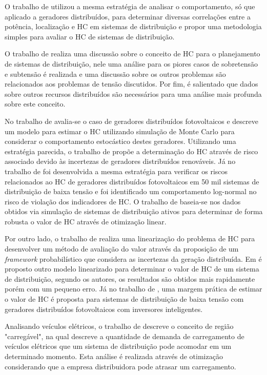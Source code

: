O trabalho de  utilizou a mesma estratégia de analisar o comportamento, só que aplicado a geradores distribuídos, para determinar diversas correlações entre a potência, localização e \ac{HC} em sistemas de distribuição e propor uma metodologia simples para avaliar o \ac{HC} de sistemas de distribuição.

O trabalho de  realiza uma discussão sobre o conceito de \ac{HC} para o planejamento de sistemas de distribuição, nele uma análise para os piores casos de sobretensão e subtensão é realizada e uma discussão sobre os outros problemas são relacionados aos problemas de tensão discutidos. Por fim, é salientado que dados sobre outros recursos distribuídos são necessários para uma análise mais profunda sobre este conceito.

No trabalho de  avalia-se o caso de geradores distribuídos fotovoltaicos e descreve um modelo para estimar o HC utilizando simulação de Monte Carlo para considerar o comportamento estocástico destes geradores. Utilizando uma estratégia parecida, o trabalho de  propõe a determinação do HC através de risco associado devido às incertezas de geradores distribuídos renováveis. Já no trabalho de  foi desenvolvida a mesma estratégia para verificar os riscos relacionados ao HC de geradores distribuídos fotovoltaicos em 50 mil sistemas de distribuição de baixa tensão e foi identificado um comportamento log-normal no risco de violação dos indicadores de HC.  O trabalho de   baseia-se nos dados obtidos via simulação de sistemas de distribuição ativos para determinar de forma robusta o valor de HC através de otimização linear.


Por outro lado, o trabalho de  realiza uma linearização do problema de HC para desenvolver um método de avaliação do valor através da proposição de um \textit{framework} probabilístico que considera as incertezas da geração distribuída. Em  é proposto outro modelo linearizado para determinar o valor de HC de um sistema de distribuição, segundo os autores, os resultados são obtidos mais rapidamente porém com um pequeno erro. Já no trabalho de , uma margem prática de estimar o valor de HC é proposta para sistemas de distribuição de baixa tensão com geradores distribuídos fotovoltaicos com inversores inteligentes.

Analisando veículos elétricos, o trabalho de  descreve o conceito de região "carregável", na qual descreve a quantidade de demanda de carregamento de veículos elétricos que um sistema de distribuição pode acomodar em um determinado momento. Esta análise é realizada através de otimização considerando que a empresa distribuidora pode atrasar um carregamento. 


